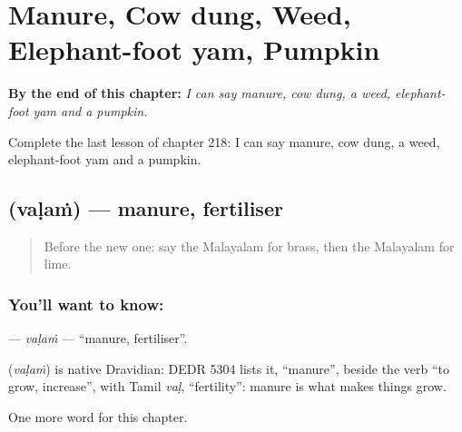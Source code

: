 
\chapter{Manure, Cow dung, Weed, Elephant-foot yam, Pumpkin}
\label{ch:ml-manure-cow-dung-weed-elephant-foot-yam-pumpkin}

\begin{chapteropening}
\textbf{By the end of this chapter:} \emph{I can say manure, cow dung, a weed, elephant-foot yam and a pumpkin.}

Complete the last lesson of chapter 218: I can say manure, cow dung, a weed, elephant-foot yam and a pumpkin.
\end{chapteropening}

\section[\texorpdfstring{\ml{വളം} (vaḷaṁ)}{വളം (vaḷaṁ)}]{ (vaḷaṁ) — manure, fertiliser}

\label{lesson:ML-C218-valam}



\begin{quote}
Before the new one: say the Malayalam for brass, then the Malayalam for lime.
\end{quote}

\subsection*{You'll want to know: }
\textbf{} — \emph{vaḷaṁ} — \textquotedblleft{}manure, fertiliser\textquotedblright{}.

\begin{cousinweb}
\textbf{} (\emph{vaḷaṁ}) is native Dravidian: DEDR 5304 lists it, \textquotedblleft{}manure\textquotedblright{}, beside the verb \textquotedblleft{}to grow, increase\textquotedblright{}, with Tamil \emph{vaḷ}, \textquotedblleft{}fertility\textquotedblright{}: manure is what makes things grow.
\end{cousinweb}

\begin{grammarlens}[title={What you've built}]
One more word for this chapter.
\end{grammarlens}

